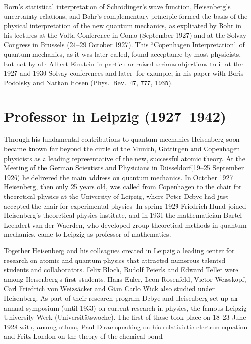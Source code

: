 \documentclass{article}
\begin{document}
Born's statistical interpretation of Schrödinger's wave function, Heisenberg's uncertainty relations, and Bohr's complementary principle formed the basis of the physical interpretation of the new quantum mechanics, as explicated by Bohr in his lectures at the Volta Conference in Como (September 1927) and at the Solvay Congress in Brussels (24--29 October 1927). This “Copenhagen Interpretation” of quantum mechanics, as it was later called, found acceptance by most physicists, but not by all: Albert Einstein in particular raised serious objections to it at the 1927 and 1930 Solvay conferences and later, for example, in his paper with Boris Podolsky and Nathan Rosen (Phys.~Rev.~47, 777, 1935).

\section{Professor in Leipzig (1927--1942)}

Through his fundamental contributions to quantum mechanics Heisenberg soon became known far beyond the circle of the Munich, Göttingen and Copenhagen physicists as a leading representative of the new, successful atomic theory. At the Meeting of the German Scientists and Physicians in Düsseldorf(19--25 September 1926) he delivered the main address on quantum mechanics. In October 1927 Heisenberg, then only 25 years old, was called from Copenhagen to the chair for theoretical physics at the University of Leipzig, where Peter Debye had just accepted the chair for experimental physics. In spring 1929 Friedrich Hund joined Heisenberg's theoretical physics institute, and in 1931 the mathematician Bartel Leendert van der Waerden, who developed group theoretical methods in quantum mechanics, came to Leipzig as professor of mathematics.

Together Heisenberg and his colleagues created in Leipzig a leading center for research on atomic and quantum physics that attracted numerous talented students and collaborators. Felix Bloch, Rudolf Peierls and Edward Teller were among Heisenberg's first students. Hans Euler, Leon Rosenfeld, Victor Weisskopf, Carl Friedrich von Weizsäcker and Gian Carlo Wick also studied under Heisenberg. As part of their research program Debye and Heisenberg set up an annual symposium (until 1933) on current research in physics, the famous Leipzig University Week (Universitätswoche). The first of these took place on 18--23 June 1928 with, among others, Paul Dirac speaking on his relativistic electron equation and Fritz London on the theory of the chemical bond.
\end{document}
